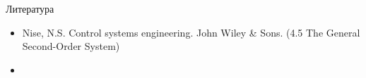 \documentclass{beamer}
\begin{document}
\begin{frame}{Литература}
	
	\begin{itemize}
		
		
		\item Nise, N.S. Control systems engineering. John Wiley \& Sons. (4.5 The General Second-Order System)	
		
		\item {}
	\end{itemize}
\end{frame}







\myqrframe
\end{document}
